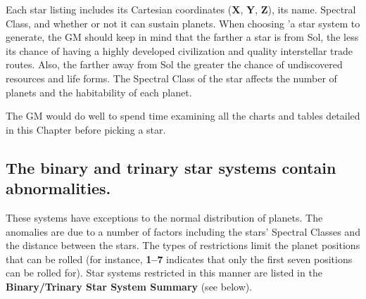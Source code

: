   Each star listing includes its Cartesian coordinates (\textbf{\textsf{X}},
  \textbf{Y}, \textbf{Z}), its name. Spectral Class, and whether or
  not it can sustain planets.  When choosing 'a star system to
  generate, the GM should keep in mind that the farther a star is from
  Sol, the less its chance of having a highly developed civilization
  and quality interstellar trade routes.  Also, the farther away from
  Sol the greater the chance of undiscovered resources and life forms.
  The Spectral Class of the star affects the number of planets and the
  habitability of each planet.
  
  The GM would do well to spend time examining all the charts and
  tables detailed in this Chapter before picking a star.

\subsection[Binary/Trinary Systems]{The binary and trinary star
  systems contain abnormalities.}
\label{sec:binary-trinary}

These systems have exceptions to the normal distribution of planets.
The anomalies are due to a number of factors including the stars'
Spectral Classes and the distance between the stars. The types of
restrictions limit the planet positions that can be rolled (for
instance, \textbf{1--7} indicates that only the first seven positions
can be rolled for). Star systems restricted in this manner are listed
in the \textbf{Binary/Trinary Star System Summary} (see below).

